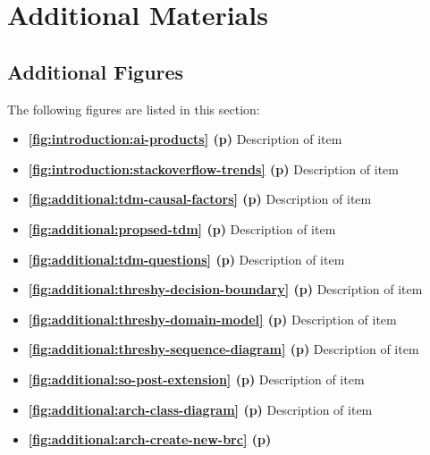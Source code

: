\chapter{Additional Materials}
\label{ch:additional-materials}

\cleardoublepage



\clearpage

\section{Additional Figures}

The following figures are listed in this section:

\begin{itemize}
\item \textbf{\cref{fig:introduction:ai-products} (p\pageref{fig:introduction:ai-products})}
  Description of item
\item \textbf{\cref{fig:introduction:stackoverflow-trends} (p\pageref{fig:introduction:stackoverflow-trends})}
  Description of item
\item \textbf{\cref{fig:additional:tdm-causal-factors} (p\pageref{fig:additional:tdm-causal-factors})}
  Description of item
\item \textbf{\cref{fig:additional:propsed-tdm} (p\pageref{fig:additional:propsed-tdm})}
  Description of item
\item \textbf{\cref{fig:additional:tdm-questions} (p\pageref{fig:additional:tdm-questions})}
  Description of item
\item \textbf{\cref{fig:additional:threshy-decision-boundary} (p\pageref{fig:additional:threshy-decision-boundary})}
  Description of item
\item \textbf{\cref{fig:additional:threshy-domain-model} (p\pageref{fig:additional:threshy-domain-model})}
  Description of item
\item \textbf{\cref{fig:additional:threshy-sequence-diagram} (p\pageref{fig:additional:threshy-sequence-diagram})}
  Description of item
\item \textbf{\cref{fig:additional:so-post-extension} (p\pageref{fig:additional:so-post-extension})}
  Description of item
\item \textbf{\cref{fig:additional:arch-class-diagram} (p\pageref{fig:additional:arch-class-diagram})}
  Description of item
\item \textbf{\cref{fig:additional:arch-create-new-brc} (p\pageref{fig:additional:arch-create-new-brc})}

\end{itemize}
